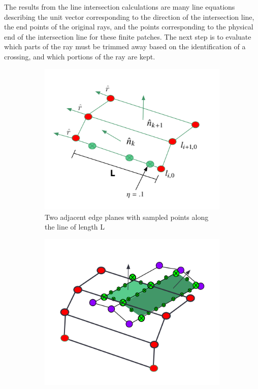 The results from the line intersection calculations are many line equations describing the unit vector corresponding to the direction of the intersection line, the end points of the original rays, and the points corresponding to the physical end of the intersection line for these finite patches. The next step is to evaluate which parts of the ray must be trimmed away based on the identification of a crossing, and which portions of the ray are kept. 
\begin{figure}
    \centering
    \begin{subfigure}[b]{0.49\textwidth}
        \includegraphics[width = \textwidth]{fig/twoplanes.png}
        \caption{Two adjacent edge planes with sampled points along the line of length L}
    \end{subfigure}
    \hfill
    \begin{subfigure}[b]{0.49\textwidth}
        \includegraphics[width = \textwidth]{fig/intersecting_planes.png}

\end{subfigure}
\end{figure}
